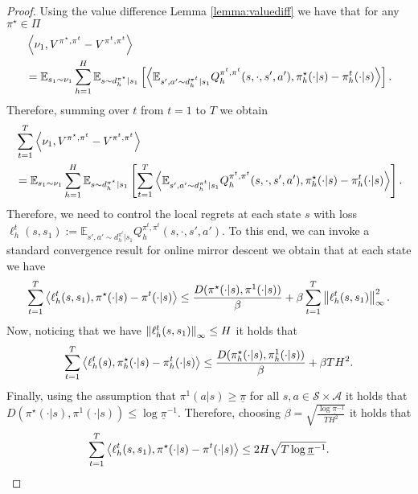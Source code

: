 \begin{proof}
Using the value difference Lemma \ref{lemma:valuediff} we have that for any $\pi^\star \in \Pi$
    \begin{align*}
&
    \left\langle{\nu_1},{V^{\pi^\star, \pi^t} -V^{\pi^t, \pi^t}}\right\rangle 
  \\& =
\mathbb{E}_{s_1\sim\nu_1}\sum^H_{h=1}\mathbb{E}_{s \sim d_h^{\pi^\star}|s_1}\left[{\left\langle{\mathbb{E}_{s',a' \sim d_h^{\pi^t}|s_1}Q_h^{\pi^t, \pi^t}(s,\cdot,s',a')},{\pi_h^\star(\cdot|s) - \pi_h^t(\cdot|s)}\right\rangle}\right].
\end{align*}
Therefore, summing over $t$ from $t=1$ to $T$ we obtain
\begin{equation*}
\begin{split}
 &   \sum^T_{t=1}\left\langle{\nu_1},{V^{\pi^\star, \pi^t} -V^{\pi^t, \pi^t}}\right\rangle
  \\& = \mathbb{E}_{s_1\sim\nu_1}\sum^H_{h=1}\mathbb{E}_{s \sim d_h^{\pi^\star}|s_1}\left[{\sum^T_{t=1}\left\langle{\mathbb{E}_{s',a' \sim d_h^{\pi^t}|s_1}Q_h^{\pi^t, \pi^t}(s,\cdot,s',a')},{\pi_h^\star(\cdot|s) - \pi_h^t(\cdot|s)}\right\rangle}\right].
\end{split}
\end{equation*}
Therefore, we need to control the local regrets at each state $s$ with loss $\ell^t_h(s,s_1) := \mathbb{E}_{s',a' \sim d_h^{\pi^t}|s_1}Q_h^{\pi^t, \pi^t}(s,\cdot,s',a')$. To this end, we can invoke a standard convergence result for online mirror descent \cite[Theorem 6.10]{orabona2023onlinelearning} we obtain that at each state we have 
\begin{equation*}
    \sum^T_{t=1} \left\langle{\ell^t_h(s,s_1)},{\pi^\star(\cdot|s) - \pi^t(\cdot|s)}\right\rangle \leq \frac{D(\pi^\star(\cdot|s), \pi^1(\cdot|s))}{ \beta} +  \beta \sum^T_{t=1} \left\lVert\ell^t_h(s,s_1)\right\rVert^2_{\infty}.
\end{equation*}
Now, noticing that we have $\left\lVert\ell^t_h(s,s_1)\right\rVert_{\infty} \leq H$ it holds that
\begin{equation*}
    \sum^T_{t=1} \left\langle{\ell^t_h(s)},{\pi_h^\star(\cdot|s) - \pi_h^t(\cdot|s)}\right\rangle \leq \frac{D(\pi_h^\star(\cdot|s), \pi_h^1(\cdot|s))}{ \beta} +  \beta T H^2.
\end{equation*}
Finally, using the assumption that $\pi^1(a|s) \geq \underline{\pi} $ for all $s,a \in \mathcal{S}\times\mathcal{A}$ it holds that $D(\pi^\star(\cdot|s), \pi^1(\cdot|s)) \leq \log \underline{\pi}^{-1}$. Therefore, choosing $ \beta = \sqrt{\frac{\log{\underline{\pi}^{-1}}}{TH^2}}$ it holds that 
\begin{equation*}
    \sum^T_{t=1} \innerprod{\ell^t_h(s,s_1)}{\pi^\star(\cdot|s) - \pi^t(\cdot|s)} \leq 2 H \sqrt{ T \log \underline{\pi}^{-1}}.

\end{equation*}
\end{proof}
